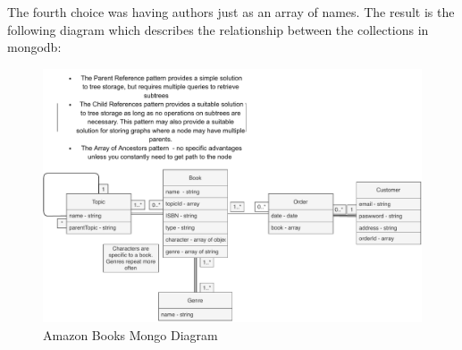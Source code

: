 \documentclass{article}
\begin{document}
	The fourth choice was having authors just as an array of names. \newline
	The result is the following diagram which describes the relationship between the collections in mongodb:
	\begin{figure}[h!]
		\includegraphics[width=\linewidth]{AmazonMongoDB.pdf}
		\caption{Amazon Books Mongo Diagram}
		\label{fig:Mongo}
	\end{figure}
\end{document}
